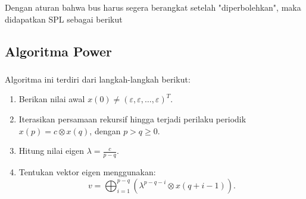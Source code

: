 \documentclass[aspectratio=169]{beamer}
\theoremstyle{definition}
\numberwithin{definisi}{subsection}
\begin{document}
\begin{frame}
    \frametitle{\insertsubsection}
    Dengan aturan bahwa bus harus segera berangkat setelah "diperbolehkan", maka didapatkan SPL sebagai berikut
\end{frame}

\subsection{Algoritma Power}
\begin{frame}
    \frametitle{\insertsubsection}
    Algoritma ini terdiri dari langkah-langkah berikut:
    \begin{enumerate}
        \item Berikan nilai awal \( x(0) \neq (\varepsilon, \varepsilon, \dots, \varepsilon)^T \).
        \item Iterasikan persamaan rekursif hingga terjadi perilaku periodik \( x(p) = c \otimes x(q) \), dengan \( p > q \geq 0 \).
        \item Hitung nilai eigen \( \lambda = \frac{c}{p-q} \).
        \item Tentukan vektor eigen menggunakan:
              \[
                  v = \bigoplus_{i=1}^{p-q} \left( \lambda^{p-q-i} \otimes x(q+i-1) \right).
              \]
    \end{enumerate}
\end{frame}
\end{document}

